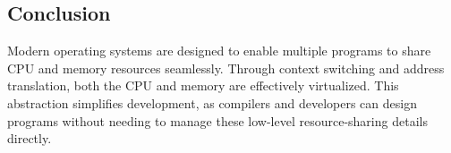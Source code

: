\documentclass[../../compsys.tex]{subfiles}
\begin{document}
\subsection{Conclusion}
Modern operating systems are designed to enable multiple programs to share CPU and memory resources seamlessly. Through context switching and address translation, both the CPU and memory are effectively virtualized. This abstraction simplifies development, as compilers and developers can design programs without needing to manage these low-level resource-sharing details directly.
\end{document}
